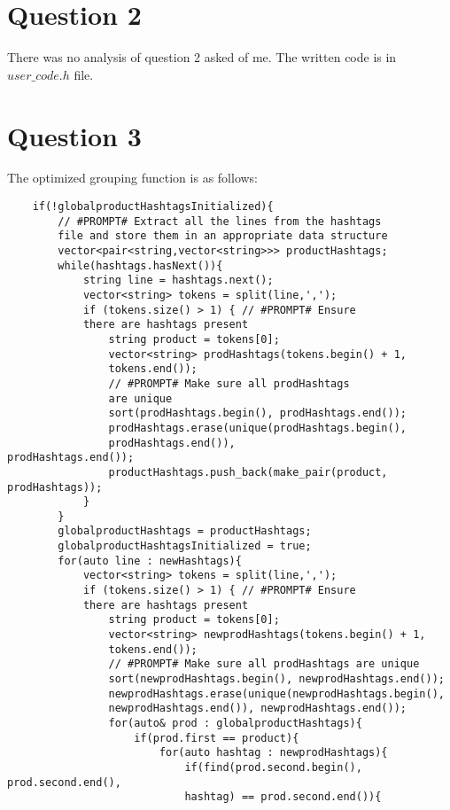 \documentclass[12pt]{article}
\begin{document}
\section*{Question 2}
There was no analysis of question 2 asked of me. The written code is in $user\_code.h$ file.\\

\section*{Question 3}
The optimized grouping function is as follows:
\begin{verbatim}
    if(!globalproductHashtagsInitialized){
        // #PROMPT# Extract all the lines from the hashtags 
        file and store them in an appropriate data structure
        vector<pair<string,vector<string>>> productHashtags;
        while(hashtags.hasNext()){
            string line = hashtags.next();
            vector<string> tokens = split(line,',');
            if (tokens.size() > 1) { // #PROMPT# Ensure 
            there are hashtags present
                string product = tokens[0];
                vector<string> prodHashtags(tokens.begin() + 1, 
                tokens.end());
                // #PROMPT# Make sure all prodHashtags 
                are unique
                sort(prodHashtags.begin(), prodHashtags.end());
                prodHashtags.erase(unique(prodHashtags.begin(), 
                prodHashtags.end()),                prodHashtags.end());
                productHashtags.push_back(make_pair(product, prodHashtags));
            }
        }
        globalproductHashtags = productHashtags;
        globalproductHashtagsInitialized = true;
        for(auto line : newHashtags){
            vector<string> tokens = split(line,',');
            if (tokens.size() > 1) { // #PROMPT# Ensure 
            there are hashtags present
                string product = tokens[0];
                vector<string> newprodHashtags(tokens.begin() + 1, 
                tokens.end());
                // #PROMPT# Make sure all prodHashtags are unique
                sort(newprodHashtags.begin(), newprodHashtags.end());
                newprodHashtags.erase(unique(newprodHashtags.begin(), 
                newprodHashtags.end()), newprodHashtags.end());
                for(auto& prod : globalproductHashtags){
                    if(prod.first == product){
                        for(auto hashtag : newprodHashtags){
                            if(find(prod.second.begin(), prod.second.end(), 
                            hashtag) == prod.second.end()){

\end{verbatim}
\end{document}
